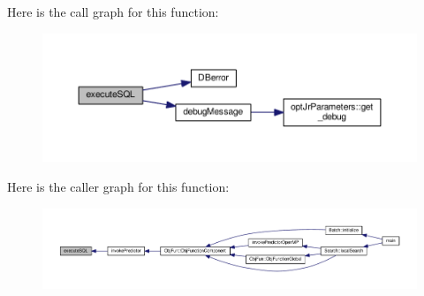 Here is the call graph for this function\-:\nopagebreak
\begin{figure}[H]
\begin{center}
\leavevmode
\includegraphics[width=350pt]{db_8hh_a2491baf1bdfde4dc81303042399a6278_cgraph}
\end{center}
\end{figure}




Here is the caller graph for this function\-:\nopagebreak
\begin{figure}[H]
\begin{center}
\leavevmode
\includegraphics[width=350pt]{db_8hh_a2491baf1bdfde4dc81303042399a6278_icgraph}
\end{center}
\end{figure}


